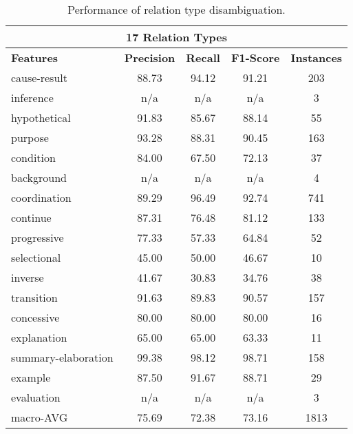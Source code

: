 \begin{table}[ht]
\begin{tabular}{|l|c|c|c|c|}
\multicolumn{5}{|c|}{17 Relation Types}                                             \\ \hline
\bf Features            & \bf Precision & \bf Recall & \bf F1-Score & \bf Instances \\ \hline
    cause-result        &     88.73     &     94.12  &     91.21    &     203       \\ \hline
    inference           &     n/a       &     n/a    &     n/a      &     3         \\ \hline
    hypothetical        &     91.83     &     85.67  &     88.14    &     55        \\ \hline
    purpose             &     93.28     &     88.31  &     90.45    &     163       \\ \hline
    condition           &     84.00     &     67.50  &     72.13    &     37        \\ \hline
    background          &     n/a       &     n/a    &     n/a      &     4         \\ \hline
    coordination        &     89.29     &     96.49  &     92.74    &     741       \\ \hline
    continue            &     87.31     &     76.48  &     81.12    &     133       \\ \hline
    progressive         &     77.33     &     57.33  &     64.84    &     52        \\ \hline
    selectional         &     45.00     &     50.00  &     46.67    &     10        \\ \hline
    inverse             &     41.67     &     30.83  &     34.76    &     38        \\ \hline
    transition          &     91.63     &     89.83  &     90.57    &     157       \\ \hline
    concessive          &     80.00     &     80.00  &     80.00    &     16        \\ \hline
    explanation         &     65.00     &     65.00  &     63.33    &     11        \\ \hline
    summary-elaboration &     99.38     &     98.12  &     98.71    &     158       \\ \hline
    example             &     87.50     &     91.67  &     88.71    &     29        \\ \hline
    evaluation          &     n/a       &     n/a    &     n/a      &     3         \\ \hline
    macro-AVG           &     75.69     &     72.38  &     73.16    &     1813      \\ \hline

\end{tabular}
\caption{\label{t:sense-types} Performance of relation type
disambiguation. }
\end{table}
